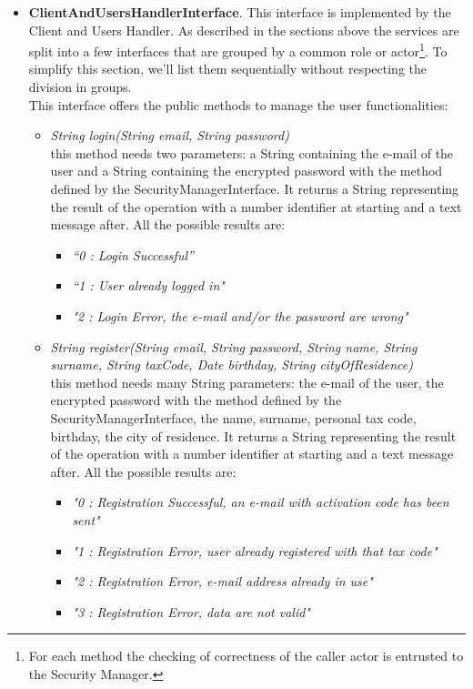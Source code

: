 \documentclass[\mainpath/main]{subfiles}
\begin{document}
\begin{itemize}
	\item \textbf{ClientAndUsersHandlerInterface}. This interface is implemented by the Client and Users Handler. As described in the sections above the services are split into a few interfaces that are grouped by a common role or actor\footnote{For each method the checking of correctness of the caller actor is entrusted to the Security Manager.}. To simplify this section, we'll list them sequentially without respecting the division in groups.\\
	This interface offers the public methods to manage the user functionalities:
	\begin{itemize}
		\item \textit{String login(String email, String password)}\\
		this method needs two parameters: a String containing the e-mail of the user and a String containing the encrypted password with the method defined by the SecurityManagerInterface. It returns a String representing the result of the operation with a number identifier at starting and a text message after. All the possible results are:
		\begin{itemize}
			\item \textit{\textquotedblleft 0 : Login Successful\textquotedblright}
			\item \textit{\textquotedblleft 1 : User already logged in"}
			\item \textit{"2 : Login Error, the e-mail and/or the password are wrong"}
		\end{itemize}
		
		\item \textit{String register(String email, String password, String name, String surname, String taxCode, Date birthday, String cityOfResidence)}\\
		this method needs many String parameters: the e-mail of the user, the encrypted password with the method defined by the SecurityManagerInterface, the name, surname, personal tax code, birthday, the city of residence. It returns a String representing the result of the operation with a number identifier at starting and a text message after. All the possible results are:
		\begin{itemize}
			\item \textit{"0 : Registration Successful, an e-mail with activation code has been sent"}
			\item \textit{"1 : Registration Error, user already registered with that tax code"}
			\item \textit{"2 : Registration Error, e-mail address already in use"}
			\item \textit{"3 : Registration Error, data are not valid"}
		\end{itemize}
		

\end{itemize}
\end{itemize}
\end{document}
